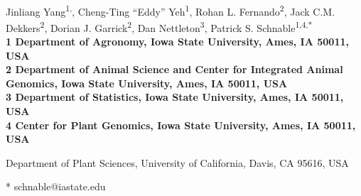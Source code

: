 \documentclass[10pt,letterpaper]{article}
\date{}
\begin{document}
\vspace*{0.35in}

\begin{flushleft}
{\Large
\textbf{}
}
\newline
\\
Jinliang Yang\textsuperscript{1,\textcurrency},
Cheng-Ting “Eddy” Yeh\textsuperscript{1},
Rohan L. Fernando\textsuperscript{2},
Jack C.M. Dekkers\textsuperscript{2},
Dorian J. Garrick\textsuperscript{2},
Dan Nettleton\textsuperscript{3},
Patrick S. Schnable\textsuperscript{1,4,*}
\\
\bigskip
\bf{1} Department of Agronomy, Iowa State University, Ames, IA 50011, USA
\\
\bf{2} Department of Animal Science and Center for Integrated Animal Genomics, Iowa State University, Ames, IA 50011, USA
\\
\bf{3} Department of Statistics, Iowa State University, Ames, IA 50011, USA
\\
\bf{4} Center for Plant Genomics, Iowa State University, Ames, IA 50011, USA
\\
\bigskip



\textcurrency Department of Plant Sciences, University of California, Davis, CA 95616, USA



* schnable@iastate.edu

\end{flushleft}
\end{document}
